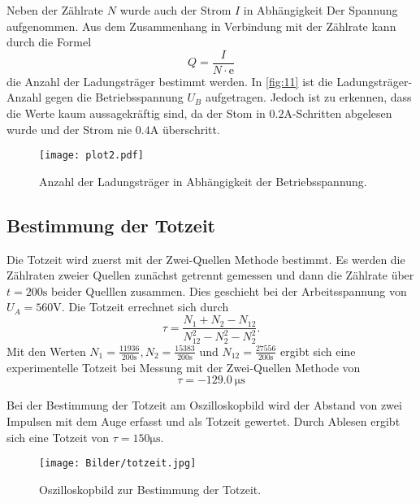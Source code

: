 \noindent Neben der Zählrate $N$ wurde auch der Strom $I$ in Abhängigkeit 
Der Spannung aufgenommen. Aus dem Zusammenhang in Verbindung 
mit der Zählrate kann durch die Formel 
\begin{equation}
    Q = \frac{I}{N \cdot \text{e}}
\end{equation}
die Anzahl der Ladungsträger bestimmt werden. In \autoref{fig:11} ist die 
Ladungsträger-Anzahl gegen die Betriebsspannung $U_B$ aufgetragen. Jedoch ist 
zu erkennen, dass die Werte kaum aussagekräftig sind, da der Stom 
in $0.2 \unit{\ampere}$-Schritten abgelesen wurde und der Strom 
nie $0.4 \unit{\ampere}$ überschritt.
\begin{figure}[H]
    \centering
    \caption{Anzahl der Ladungsträger in Abhängigkeit der Betriebsspannung.}
    \label{fig:11}
    \texttt{[image: plot2.pdf]}
\end{figure}

\subsection{Bestimmung der Totzeit}
Die Totzeit wird zuerst mit der Zwei-Quellen Methode bestimmt. Es 
werden die Zählraten zweier Quellen zunächst getrennt gemessen und 
dann die Zählrate über $t = 200 \unit{\second}$ beider Quelllen zusammen. Dies
geschieht bei der Arbeitsspannung von $U_A = 560 \unit{\volt}$. Die Totzeit
errechnet sich durch
\begin{equation}
    \tau = \frac{N_\text{1} + N_\text{2} - N_\text{12}}{N_\text{12}^2 - N_\text{2}^2 - N_\text{2}^2}.
\end{equation}
Mit den Werten $N_\text{1} = \frac{11936}{200\unit{\second}} , N_\text{2} =
\frac{15383}{200\unit{\second}} $ und $ N_\text{12} =
\frac{27556}{200\unit{\second}}$ ergibt sich eine 
experimentelle Totzeit bei Messung mit der Zwei-Quellen Methode von 
\begin{equation}
    \tau = \qty{-129.0}{\micro\second} 
\end{equation}

\noindent Bei der Bestimmung der Totzeit am Oszilloskopbild wird der Abstand
von zwei Impulsen mit dem Auge erfasst und als Totzeit gewertet. Durch Ablesen
ergibt sich eine Totzeit von $\tau = 150 \unit{\micro\second}$.
\begin{figure}[H]
    \centering
    \caption{Oszilloskopbild zur Bestimmung der Totzeit.}
    \label{fig:12}
    \texttt{[image: Bilder/totzeit.jpg]}
\end{figure}